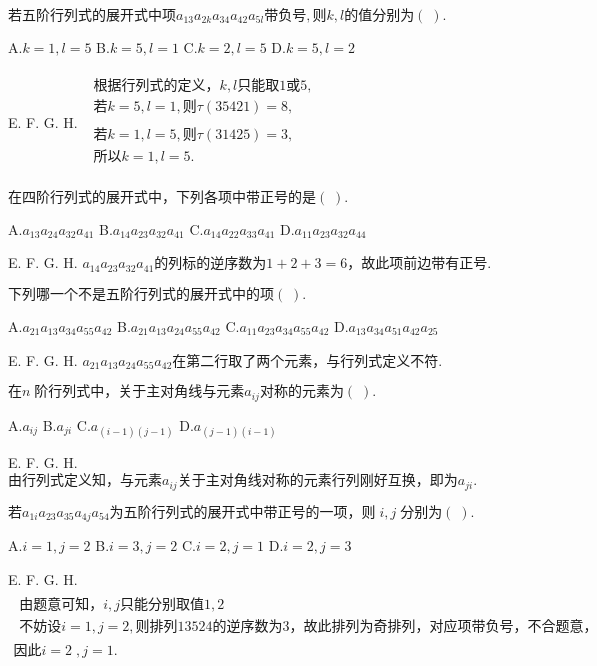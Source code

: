 $\mathrm{若五阶行列式的展开式中项}a_{13}a_{2k}a_{34}a_{42}a_{5l}\mathrm{带负号},\mathrm 则k,l\mathrm{的值分别为}(\;).$

A.$k=1,l=5$   B.$k=5,l=1$   C.$k=2,l=5$   D.$k=5,l=2$

E.   F.   G.   H.
$\begin{array}{l}\begin{array}{l}\mathrm{根据行列式的定义}，k,l\mathrm{只能取}1或5,\\若k=5,l=1,则\tau(35421)=8,\end{array}\\\begin{array}{l}若k=1,l=5,则\tau(31425)=3,\\\mathrm{所以}k=1,l=5.\\\end{array}\end{array}$


$\mathrm{在四阶行列式的展开式中}，\mathrm{下列各项中带正号的是}(\;).$

A.$a_{13}a_{24}a_{32}a_{41}$   B.$a_{14}a_{23}a_{32}a_{41}$   C.$a_{14}a_{22}a_{33}a_{41}$   D.$a_{11}a_{23}a_{32}a_{44}$

E.   F.   G.   H.
$a_{14}a_{23}a_{32}a_{41}\mathrm{的列标的逆序数为}1+2+3=6，\mathrm{故此项前边带有正号}.$


$\mathrm{下列哪一个不是五阶行列式的展开式中的项}(\;).$

A.$a_{21}a_{13}a_{34}a_{55}a_{42}$   B.$a_{21}a_{13}a_{24}a_{55}a_{42}$   C.$a_{11}a_{23}a_{34}a_{55}a_{42}$   D.$a_{13}a_{34}a_{51}a_{42}a_{25}$

E.   F.   G.   H.
$a_{21}a_{13}a_{24}a_{55}a_{42}\mathrm{在第二行取了两个元素}，\mathrm{与行列式定义不符}.$


$在n\;\mathrm{阶行列式中}，\mathrm{关于主对角线与元素}a_{ij}\mathrm{对称的元素为}(\;).$

A.$a_{ij}$   B.$a_{ji}$   C.$a_{(i-1)(j-1)}$   D.$a_{(j-1)(i-1)}$

E.   F.   G.   H.
$\mathrm{由行列式定义知}，\mathrm{与元素}a_{ij}\mathrm{关于主对角线对称的元素行列刚好互换}，\mathrm{即为}a_{ji}.$


$若a_{1i}a_{23}a_{35}a_{4j}a_{54}\mathrm{为五阶行列式的展开式中带正号的一项}，则\;i,j\;\mathrm{分别为}(\;).$

A.$i=1,j=2$   B.$i=3,j=2$   C.$i=2,j=1$   D.$i=2,j=3$

E.   F.   G.   H.
$\begin{array}{l}\begin{array}{l}\mathrm{由题意可知}，i,j\mathrm{只能分别取值}1,2\\\mathrm{不妨设}i=1,j=2,\mathrm{则排列}13524\mathrm{的逆序数为}3，\mathrm{故此排列为奇排列}，\mathrm{对应项带负号}，\mathrm{不合题意}，\end{array}\\\mathrm{因此}i=2\;,j=1.\end{array}$


